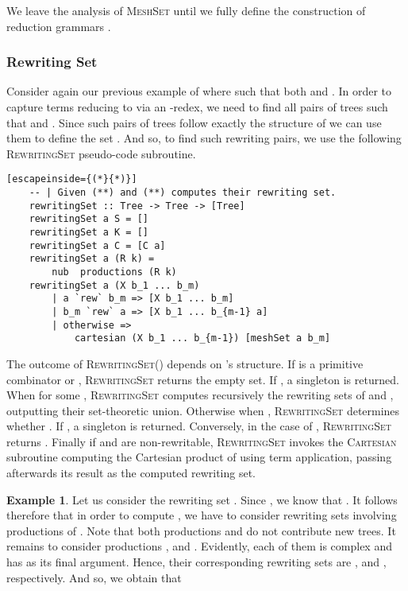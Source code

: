 \documentclass[11pt,a4paper]{amsart}
\theoremstyle{definition}
\newtheorem{example}[theorem]{Example}
\begin{document}
We leave the analysis of \textsc{MeshSet}  until we fully define the construction of reduction grammars .

\subsubsection{Rewriting Set}
Consider again our previous example of  where  such that both  and . In order to capture terms reducing to  via an -redex, we need to find all pairs of trees  such that  and . Since such pairs of trees follow exactly the structure of  we can use them to define the set . And so, to find such rewriting pairs, we use the following \textsc{RewritingSet} pseudo-code subroutine.

\begin{lstlisting}[escapeinside={(*}{*)}]
    -- | Given (**) and (**) computes their rewriting set. 
    rewritingSet :: Tree -> Tree -> [Tree]
    rewritingSet a S = []
    rewritingSet a K = []
    rewritingSet a C = [C a]
    rewritingSet a (R k) = 
    	nub  productions (R k)
    rewritingSet a (X b_1 ... b_m)
    	| a `rew` b_m => [X b_1 ... b_m]
    	| b_m `rew` a => [X b_1 ... b_{m-1} a]
    	| otherwise => 
    		cartesian (X b_1 ... b_{m-1}) [meshSet a b_m] 
\end{lstlisting}

The outcome of \textsc{RewritingSet}() depends on 's structure. If  is a primitive combinator  or , \textsc{RewritingSet} returns the empty set. If , a singleton  is returned. When  for some , \textsc{RewritingSet} computes recursively the rewriting sets of  and , outputting their set-theoretic union. Otherwise when , \textsc{RewritingSet} determines whether . If , a singleton  is returned. Conversely, in the case of , \textsc{RewritingSet} returns . Finally if  and  are non-rewritable, \textsc{RewritingSet} invokes the \textsc{Cartesian} subroutine computing the Cartesian product of  using term application, passing afterwards its result as the computed rewriting set.

\begin{example}
Let us consider the rewriting set . Since , we know that .
It follows therefore that in order to compute , we have to consider rewriting sets involving productions of . Note that both productions  and  do not contribute new trees. It remains to consider productions ,  and . Evidently, each of them is complex and has  as its final argument. Hence, their corresponding rewriting sets are ,  and , respectively. And so, we obtain that

\end{example}
\end{document}
